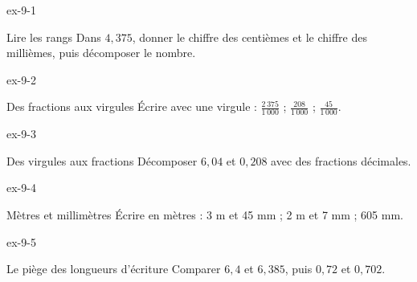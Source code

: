 \clearpage{}
\begin{blocLivre}{ex-9-1}\begin{exercice}[1]{Lire les rangs}
Dans $4{,}375$, donner le chiffre des centièmes et le chiffre des millièmes, puis décomposer le nombre.
\end{exercice}\end{blocLivre}
\begin{blocLivre}{ex-9-2}\begin{exercice}[1]{Des fractions aux virgules}
Écrire avec une virgule : $\frac{2\,375}{1\,000}$ ; $\frac{208}{1\,000}$ ; $\frac{45}{1\,000}$.
\end{exercice}\end{blocLivre}
\begin{blocLivre}{ex-9-3}\begin{exercice}[1]{Des virgules aux fractions}
Décomposer $6{,}04$ et $0{,}208$ avec des fractions décimales.
\end{exercice}\end{blocLivre}
\begin{blocLivre}{ex-9-4}\begin{exercice}[1]{Mètres et millimètres}
Écrire en mètres : 3 m et 45 mm ; 2 m et 7 mm ; 605 mm.
\end{exercice}\end{blocLivre}
\begin{blocLivre}{ex-9-5}\begin{exercice}[1]{Le piège des longueurs d’écriture}
Comparer $6{,}4$ et $6{,}385$, puis $0{,}72$ et $0{,}702$.
\end{exercice}\end{blocLivre}

